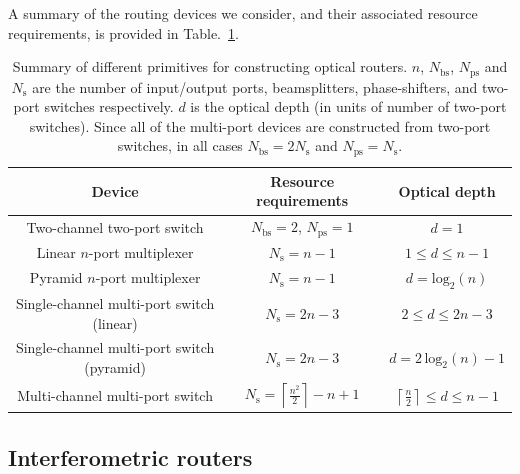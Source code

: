 \documentclass[aps, rmp, twocolumn, amsmath, amssymb, nofootinbib, superscriptaddress, longbibliography, floatfix, table-of-contents, eqsecnum]{revtex4-1}
\renewcommand{\tablename}{ALG.}
\begin{document}
A summary of the routing devices we consider, and their associated resource requirements, is provided in Table.~\ref{tab:router_summary}.

\renewcommand{\tablename}{TABLE}

\begin{table}[!htb]
	\begin{tabular}{|c|c|c|}
		\hline
  		Device & Resource requirements & Optical depth \\
  		\hline
  		\hline
  		Two-channel two-port switch & \mbox{$N_\mathrm{bs}=2$}, \mbox{$N_\mathrm{ps}=1$} & \mbox{$d=1$} \\
  		Linear $n$-port multiplexer & \mbox{$N_\mathrm{s}=n-1$} & \mbox{$1\leq d\leq n-1$} \\
  		Pyramid $n$-port multiplexer & \mbox{$N_\mathrm{s}=n-1$} & \mbox{$d=\mathrm{log}_2(n)$} \\
    	Single-channel multi-port switch (linear) & \mbox{$N_\mathrm{s}=2n-3$} & \mbox{$2\leq d\leq 2n-3$} \\
  		Single-channel multi-port switch (pyramid) & \mbox{$N_\mathrm{s}=2n-3$} & \mbox{$d=2\,\mathrm{log}_2(n)-1$} \\
  		Multi-channel multi-port switch & \mbox{$N_\mathrm{s} = \left\lceil \frac{n^2}{2}\right\rceil - n + 1$} & \mbox{$\left\lceil \frac{n}{2} \right\rceil \leq d\leq n-1$} \\
    	\hline
	\end{tabular}
	\caption{Summary of different primitives for constructing optical routers. $n$, $N_\mathrm{bs}$, $N_\mathrm{ps}$ and $N_\mathrm{s}$ are the number of input/output ports, beamsplitters, phase-shifters, and two-port switches respectively. $d$ is the optical depth (in units of number of two-port switches). Since all of the multi-port devices are constructed from two-port switches, in all cases \mbox{$N_\mathrm{bs} = 2 N_\mathrm{s}$} and \mbox{$N_\mathrm{ps} = N_\mathrm{s}$}.} \label{tab:router_summary} 
\end{table}

\renewcommand{\tablename}{ALG.}

%
%

\subsection{Interferometric routers}

%
%
\end{document}
